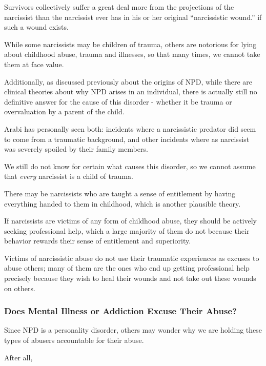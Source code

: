 \documentclass[oneside]{book}
\numberwithin{equation}{section}
\begin{document}
Survivors collectively suffer a great deal more from the projections of the narcissist than the narcissist ever has in his or her original ``narcissistic wound.'' if such a wound exists.

While some narcissists may be children of trauma, others are notorious for lying about childhood abuse, trauma and illnesses, so that many times, we cannot take them at face value.

Additionally, as discussed previously about the origins of NPD, while there are clinical theories about why NPD arises in an individual, there is actually still no definitive answer for the cause of this disorder - whether it be trauma or overvaluation by a parent of the child.

Arabi has personally seen both: incidents where a narcissistic predator did seem to come from a traumatic background, and other incidents where as narcissist was severely spoiled by their family members.

%
We still do not know for certain what causes this disorder, so we cannot assume that \textit{every} narcissist is a child of trauma.

There may be narcissists who are taught a sense of entitlement by having everything handed to them in childhood, which is another plausible theory.


%
If narcissists are victims of any form of childhood abuse, they should be actively seeking professional help, which a large majority of them do not because their behavior rewards their sense of entitlement and superiority.

Victims of narcissistic abuse do not use their traumatic experiences as excuses to abuse others; many of them are the ones who end up getting professional help precisely because they wish to heal their wounds and not take out these wounds on others.

\subsubsection{Does Mental Illness or Addiction Excuse Their Abuse?}
Since NPD is a personality disorder, others may wonder why we are holding these types of abusers accountable for their abuse.

After all,
\end{document}
